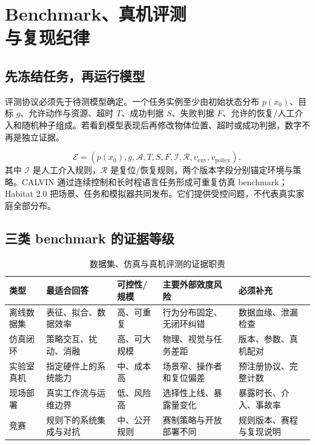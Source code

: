 \chapter[Benchmark、真机评测与复现纪律]{Benchmark、真机评测\\与复现纪律}
\label{chap:benchmark-reproducibility}

\section{先冻结任务，再运行模型}

评测协议必须先于待测模型确定。一个任务实例至少由初始状态分布 $p(x_0)$、目标 $g$、允许动作与资源、超时 $T$、成功判据 $S$、失败判据 $F$、允许的恢复/人工介入和随机种子组成。若看到模型表现后再修改物体位置、超时或成功判据，数字不再是独立证据。

\begin{equation}
\mathcal E=(p(x_0),g,\mathcal A,T,S,F,
\mathcal I,\mathcal R,v_{\mathrm{env}},v_{\mathrm{policy}}),
\label{eq:evaluation-contract}
\end{equation}
其中 $\mathcal I$ 是人工介入规则，$\mathcal R$ 是复位/恢复规则，两个版本字段分别锚定环境与策略。CALVIN 通过连续控制和长时程语言任务形成可重复仿真 benchmark\cite{mees2022calvin}；Habitat 2.0 把场景、任务和模拟器共同发布\cite{szot2021habitat2}。它们提供受控问题，不代表真实家庭全部分布。

\section{三类 benchmark 的证据等级}

\begin{table}[H]
\centering
\caption{数据集、仿真与真机评测的证据职责}
\label{tab:benchmark-evidence-levels}
\begin{tabularx}{\textwidth}{p{}YYYY}
\toprule
类型 & 最适合回答 & 可控性/规模 & 主要外部效度风险 & 必须补充 \\
\midrule
离线数据集 & 表征、拟合、数据效率 & 高、可重复 & 行为分布固定、无闭环纠错 & 数据血缘、泄漏检查 \\
仿真闭环 & 策略交互、扰动、消融 & 高、可大规模 & 物理、视觉与任务差距 & 版本、参数、真机配对 \\
实验室真机 & 指定硬件上的系统能力 & 中、成本高 & 场景窄、操作者和复位偏差 & 预注册协议、完整计数 \\
现场部署 & 真实工作流与运维边界 & 低、风险高 & 选择性上线、暴露量变化 & 暴露时长、介入、事故率 \\
竞赛 & 规则下的系统集成与对抗 & 中、公开规则 & 赛制策略与开放部署不同 & 规则版本、赛程与复现说明 \\
\bottomrule
\end{tabularx}
\end{table}

